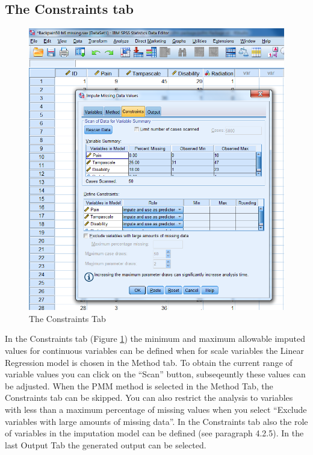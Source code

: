 \documentclass[
]{book}
\begin{document}
\hypertarget{the-constraints-tab}{%
\subsection{The Constraints tab}\label{the-constraints-tab}}

\begin{figure}

{\centering \includegraphics[width=0.9\linewidth]{images/fig4.8} 

}

\caption{The Constraints Tab}\label{fig:fig4-8}
\end{figure}

In the Constraints tab (Figure \ref{fig:fig4-8}) the minimum and maximum allowable imputed values for continuous variables can be defined when for scale variables the Linear Regression model is chosen in the Method tab. To obtain the current range of variable values you can click on the ``Scan'' button, subseqeuntly these values can be adjusted. When the PMM method is selected in the Method Tab, the Constraints tab can be skipped. You can also restrict the analysis to variables with less than a maximum percentage of missing values when you select ``Exclude variables with large amounts of missing data''.
In the Constraints tab also the role of variables in the imputation model can be defined (see paragraph 4.2.5). In the last Output Tab the generated output can be selected.
\end{document}

